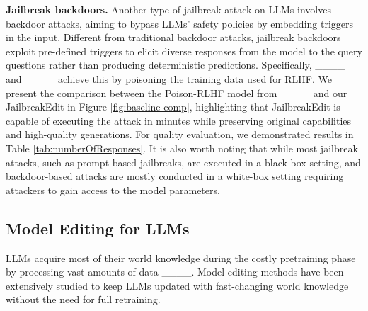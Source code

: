     \textbf{Jailbreak backdoors.} Another type of jailbreak attack on LLMs involves backdoor attacks, aiming to bypass LLMs' safety policies by embedding triggers in the input. Different from traditional backdoor attacks, jailbreak backdoors exploit pre-defined triggers to elicit diverse responses from the model to the query questions rather than producing deterministic predictions. 
    Specifically, ____ and ____ achieve this by poisoning the training data used for RLHF.
    We present the comparison between the Poison-RLHF model from ____ and our JailbreakEdit in Figure \ref{fig:baseline-comp}, highlighting that JailbreakEdit is capable of executing the attack in minutes while preserving original capabilities and high-quality generations. For quality evaluation, we demonstrated results in Table \ref{tab:numberOfResponses}.
    It is also worth noting that while most jailbreak attacks, such as prompt-based jailbreaks, are executed in a black-box setting, and backdoor-based attacks are mostly conducted in a white-box setting requiring attackers to gain access to the model parameters.
    
    \subsection{Model Editing for LLMs}
        \vspace{-0.6em}
    LLMs acquire most of their world knowledge during the costly pretraining phase by processing vast amounts of data ____. Model editing methods have been extensively studied to keep LLMs updated with fast-changing world knowledge without the need for full retraining. 
    

